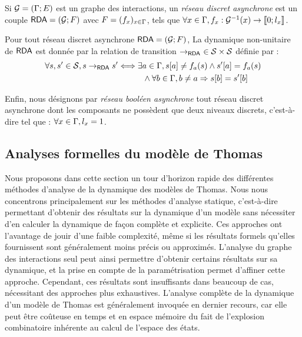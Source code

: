 \begin{definition}
  Si $\mathcal{G} = (\mathrm{\Gamma}; E)$ est un graphe des interactions,
  un \emph{réseau discret asynchrone} est un couple $\mathsf{RDA} = (\mathcal{G}; F)$
  avec $F = (f_x)_{x \in \mathrm{\Gamma}}$, tels que
  $\forall x \in \mathrm{\Gamma}, f_x : \mathcal{G}^{-1}(x) \rightarrow \mathopen{\llbracket}0\mathclose{};l_x\mathclose{\rrbracket}$.
\end{definition}

\begin{definition}
  Pour tout réseau discret asynchrone $\mathsf{RDA} = (\mathcal{G}; F)$,
  La dynamique non-unitaire de $\mathsf{RDA}$ est donnée par la relation de transition
  $\rightarrow_{\mathsf{RDA}}\ \in \mathcal{S} \times \mathcal{S}$ définie par :
  \begin{align*}
    \forall s, s' \in \mathcal{S}, s \rightarrow_{\mathsf{RDA}} s'
      &\Longleftrightarrow \exists a \in \mathrm{\Gamma},
    {s[a]} \neq f_a(s) \wedge
      {s'[a]} = f_a(s) \\
      &\qquad\quad \wedge \forall b \in \mathrm{\Gamma}, b \neq a \Rightarrow {s[b]} = {s'[b]}
  \end{align*}
\end{definition}

Enfin, nous désignons par \emph{réseau booléen asynchrone}
tout réseau discret asynchrone dont les composants ne possèdent que deux niveaux discrets,
c'est-à-dire tel que : $\forall x \in \mathrm{\Gamma}, l_x = 1$.



\subsection{Analyses formelles du modèle de Thomas}

Nous proposons dans cette section un tour d'horizon rapide des différentes méthodes
d'analyse de la dynamique des modèles de Thomas.
Nous nous concentrons principalement sur les méthodes d'analyse statique,
c'est-à-dire permettant d'obtenir des résultats sur la dynamique d'un modèle
sans nécessiter d'en calculer la dynamique de façon complète et explicite.
Ces approches ont l'avantage de jouir d'une faible complexité, même si les résultats formels
qu'elles fournissent sont généralement moins précis ou approximés.
L'analyse du graphe des interactions seul peut ainsi permettre d'obtenir certains
résultats sur sa dynamique,
et la prise en compte de la paramétrisation permet d'affiner cette approche.
Cependant, ces résultats sont insuffisants dans beaucoup de cas,
nécessitant des approches plus exhaustives.
L'analyse complète de la dynamique d'un modèle de Thomas
est généralement invoquée en dernier recours, car elle peut être coûteuse en temps
et en espace mémoire du fait de l'explosion combinatoire inhérente au calcul
de l'espace des états.

